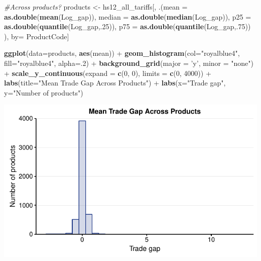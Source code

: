 \documentclass[10pt,]{article}
\newenvironment{Shaded}{\begin{snugshade}}{\end{snugshade}}
\newcommand{\KeywordTok}[1]{\textcolor[rgb]{0.13,0.29,0.53}{\textbf{{#1}}}}
\newcommand{\DataTypeTok}[1]{\textcolor[rgb]{0.13,0.29,0.53}{{#1}}}
\newcommand{\DecValTok}[1]{\textcolor[rgb]{0.00,0.00,0.81}{{#1}}}
\newcommand{\StringTok}[1]{\textcolor[rgb]{0.31,0.60,0.02}{{#1}}}
\newcommand{\CommentTok}[1]{\textcolor[rgb]{0.56,0.35,0.01}{\textit{{#1}}}}
\newcommand{\NormalTok}[1]{{#1}}
\begin{document}
\begin{Shaded}
\begin{Highlighting}[]
\CommentTok{#Across products?}
\NormalTok{products <-}\StringTok{ }\NormalTok{hs12_all_tariffs[, .(}\DataTypeTok{mean =} \KeywordTok{as.double}\NormalTok{(}\KeywordTok{mean}\NormalTok{(Log_gap)),}
                           \DataTypeTok{median =} \KeywordTok{as.double}\NormalTok{(}\KeywordTok{median}\NormalTok{(Log_gap)),}
                           \DataTypeTok{p25 =} \KeywordTok{as.double}\NormalTok{(}\KeywordTok{quantile}\NormalTok{(Log_gap,.}\DecValTok{25}\NormalTok{)),}
                           \DataTypeTok{p75 =} \KeywordTok{as.double}\NormalTok{(}\KeywordTok{quantile}\NormalTok{(Log_gap,.}\DecValTok{75}\NormalTok{))}
\NormalTok{),}
\NormalTok{by=}\StringTok{ }\NormalTok{ProductCode]}

\KeywordTok{ggplot}\NormalTok{(}\DataTypeTok{data=}\NormalTok{products, }\KeywordTok{aes}\NormalTok{(mean)) +}
\StringTok{  }\KeywordTok{geom_histogram}\NormalTok{(}\DataTypeTok{col=}\StringTok{"royalblue4"}\NormalTok{,}
                 \DataTypeTok{fill=}\StringTok{"royalblue4"}\NormalTok{,}
                 \DataTypeTok{alpha=}\NormalTok{.}\DecValTok{2}\NormalTok{) +}
\StringTok{  }\KeywordTok{background_grid}\NormalTok{(}\DataTypeTok{major =} \StringTok{'y'}\NormalTok{, }\DataTypeTok{minor =} \StringTok{"none"}\NormalTok{) +}
\StringTok{  }\KeywordTok{scale_y_continuous}\NormalTok{(}\DataTypeTok{expand =} \KeywordTok{c}\NormalTok{(}\DecValTok{0}\NormalTok{, }\DecValTok{0}\NormalTok{), }\DataTypeTok{limits =} \KeywordTok{c}\NormalTok{(}\DecValTok{0}\NormalTok{, }\DecValTok{4000}\NormalTok{))  +}
\StringTok{  }\KeywordTok{labs}\NormalTok{(}\DataTypeTok{title=}\StringTok{"Mean Trade Gap Across Products"}\NormalTok{) +}
\StringTok{  }\KeywordTok{labs}\NormalTok{(}\DataTypeTok{x=}\StringTok{"Trade gap"}\NormalTok{, }\DataTypeTok{y=}\StringTok{"Number of products"}\NormalTok{)}
\end{Highlighting}
\end{Shaded}

\begin{center}\includegraphics{Figs/value_summary-2} \end{center}
\end{document}

